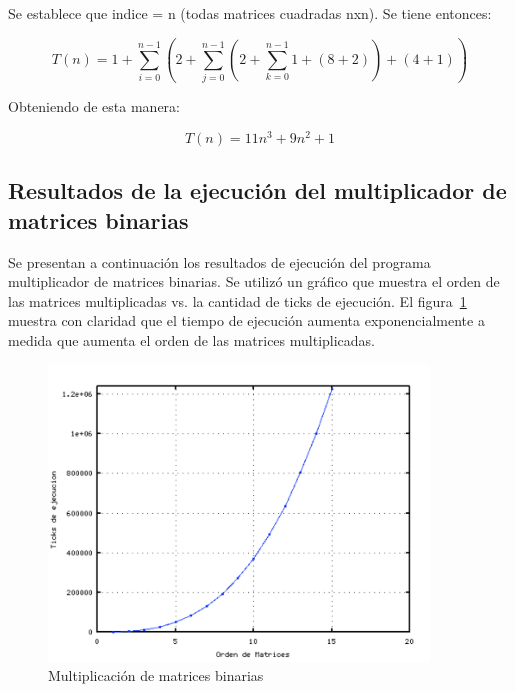 		Se establece que indice = n (todas matrices cuadradas nxn). Se tiene entonces: 
		
		\begin{equation*}
		T(n) = 1 + \sum_{i=0}^{n-1} \left (2 + \sum_{j=0}^{n-1} \left (2 + \sum_{k=0}^{n-1} 1 + (8+2)\right ) + (4 + 1) \right )      
		\end{equation*}
		
		Obteniendo de esta manera:
		
		\begin{equation*}
		T(n) = 11 n^3 + 9 n^2 + 1       
		\end{equation*}
		 
		
		\subsection{Resultados de la ejecución del multiplicador de matrices binarias}
			
		Se presentan a continuación los resultados de ejecución del programa multiplicador de matrices binarias. Se utilizó un gráfico que muestra el orden
		de las matrices multiplicadas vs. la cantidad de ticks de ejecución. El figura~\ref{fig:mulmat} muestra con claridad que el tiempo de ejecución
		aumenta exponencialmente a medida que aumenta el orden de las matrices multiplicadas.
		
\begin{figure}[h!]
 	\begin{center}
  	\includegraphics[width=0.9\textwidth,keepaspectratio=true]{./images/calculomatriz}
  	\caption{Multiplicación de matrices binarias}
  	\label{fig:mulmat}
 	\end{center}
	\end{figure}

